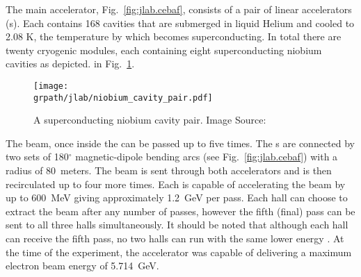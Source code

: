 The main accelerator, Fig.~\ref{fig:jlab.cebaf}, consists of a pair of linear accelerators (s\label{abbr:linac}). Each  contains 168   cavities that are submerged in liquid Helium and cooled to 2.08 K, the temperature by which  becomes superconducting. In total there are twenty cryogenic modules, each containing eight superconducting niobium cavities as depicted. in Fig.~\ref{fig:jlab.cavity}. 


\begin{figure}\begin{center} 
\texttt{[image: \\grpath/jlab/niobium\_cavity\_pair.pdf]}
\caption[A  superconducting niobium cavity pair]{\label{fig:jlab.cavity}A  superconducting niobium cavity pair. Image Source: \cite{cebaf}}
\end{center}\end{figure}

The beam, once inside the  can be passed up to five times. The s are connected by two sets of 180$^\circ$ magnetic-dipole bending arcs (see Fig.~\ref{fig:jlab.cebaf}) with a radius of 80~meters. The beam is sent through both accelerators and is then recirculated up to four more times. Each  is capable of accelerating the beam by up to 600~MeV giving approximately 1.2~GeV per pass. Each hall can choose to extract the beam after any number of passes, however the fifth (final) pass can be sent to all three halls simultaneously. It should be noted that although each hall can receive the fifth pass, no two halls can run with the same lower energy \cite{clas.pass}. At the time of the  experiment, the accelerator was capable of delivering a maximum electron beam energy of 5.714~GeV.
